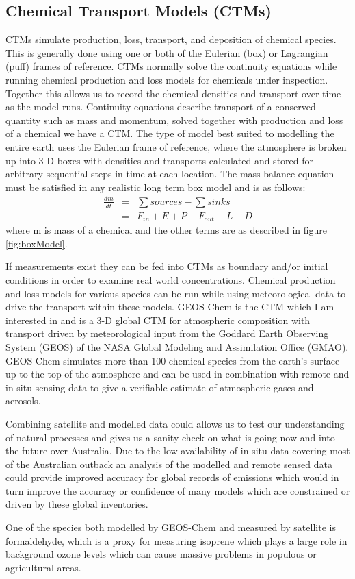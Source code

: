 \subsection{Chemical Transport Models (CTMs)}
CTMs simulate production, loss, transport, and deposition of chemical species.
This is generally done using one or both of the Eulerian (box) or Lagrangian (puff) frames of reference.
CTMs normally solve the continuity equations while running chemical production and loss models for chemicals under inspection. Together this allows us to record the chemical densities and transport over time as the model runs.
Continuity equations describe transport of a conserved quantity such as mass and momentum, solved together with production and loss of a chemical we have a CTM.
The type of model best suited to modelling the entire earth uses the Eulerian frame of reference, where the atmosphere is broken up into 3-D boxes with densities and transports calculated and stored for arbitrary sequential steps in time at each location.
The mass balance equation must be satisfied in any realistic long term box model and is as follows: 
\begin{eqnarray*}
\frac{dm}{dt} &=& \sum{sources}-\sum{sinks} \\
    &=& F_{in} + E + P - F_{out} - L - D \end{eqnarray*}
where m is mass of a chemical and the other terms are as described in figure \ref{fig:boxModel}.

If measurements exist they can be fed into CTMs as boundary and/or initial conditions in order to examine real world concentrations.
Chemical production and loss models for various species can be run while using meteorological data to drive the transport within these models.
GEOS-Chem is the CTM which I am interested in and is a 3-D global CTM for atmospheric composition with transport driven by meteorological input from the Goddard Earth Observing System (GEOS) of the NASA Global Modeling and Assimilation Office (GMAO).
GEOS-Chem simulates more than 100 chemical species from the earth's surface up to the top of the atmosphere and can be used in combination with remote and in-situ sensing data to give a verifiable estimate of atmospheric gases and aerosols.

Combining satellite and modelled data could allows us to test our understanding of natural processes and gives us a sanity check on what is going now and into the future over Australia.
Due to the low availability of in-situ data covering most of the Australian outback an analysis of the modelled and remote sensed data could provide improved accuracy for global records of emissions which would in turn improve the accuracy or confidence of many models which are constrained or driven by these global inventories.

One of the species both modelled by GEOS-Chem and measured by satellite is formaldehyde, which is a proxy for measuring isoprene which plays a large role in background ozone levels which can cause massive problems in populous or agricultural areas.